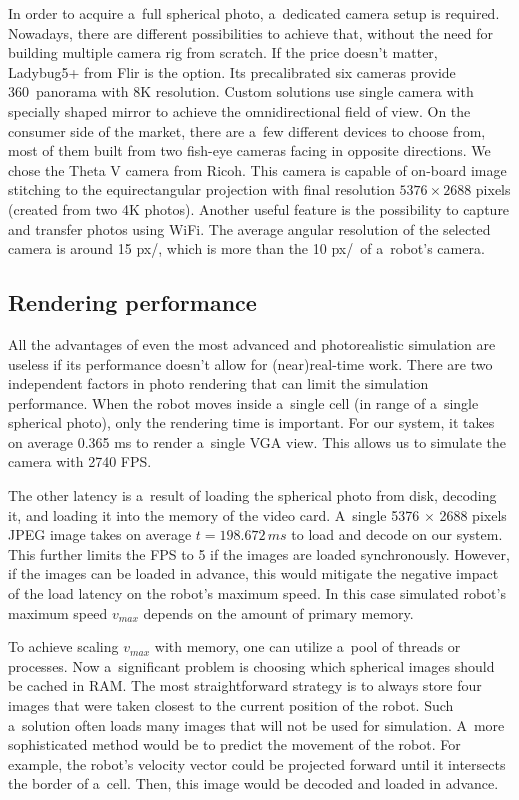 \documentclass[conference]{ieeetran}
\begin{document}
In order to acquire a~full spherical photo, a~dedicated camera setup is required. Nowadays, there are different 
possibilities to achieve that, without the need for building multiple camera rig from scratch. If the price 
doesn't matter, Ladybug5+ from Flir is the option. Its precalibrated six cameras provide 360\textdegree\ 
panorama with 8K resolution. Custom solutions use single camera with specially shaped mirror \cite{wkasik2017embedded}
to achieve the omnidirectional field of view. On the consumer side of the market, there are a~few different devices to choose from,
most of them built from two fish-eye cameras facing in opposite directions. We chose the Theta V camera from Ricoh. 
This camera is capable of on-board image stitching to the equirectangular projection with final resolution
$5376\times2688$ pixels (created from two 4K photos). Another useful feature is the possibility to capture
and transfer photos using WiFi. The average angular resolution of the selected camera is around 15 px/\textdegree, 
which is more than the 10 px/\textdegree\ of a~robot's camera. 

\subsection{Rendering performance}

All the advantages of even the most advanced and photorealistic simulation are useless if its performance 
doesn't allow for (near)real-time work. There are two independent factors in photo rendering that can limit
the simulation performance. When the robot moves inside a~single cell (in range of a~single spherical
photo), only the rendering time is important. For our system, it takes on average 0.365 ms to
render a~single VGA view. This allows us to simulate the camera with 2740 FPS. 

The other latency is a~result of loading the spherical photo from disk, decoding it, and loading it into the memory of the video card.
A~single 5376 $\times$ 2688 pixels JPEG image takes on average $t = 198.672\,ms$ to load and decode on our system.
This further limits the FPS to 5 if the images are loaded synchronously.
However, if the images can be loaded in advance, this would mitigate the negative impact of the load latency on the robot's maximum speed.
In this case simulated robot's maximum speed $v_{max}$ depends on the amount of primary memory.

To achieve scaling $v_{max}$ with memory, one can utilize a~pool of threads or processes.
Now a~significant problem is choosing which spherical images should be cached in RAM.
The most straightforward strategy is to always store four images that were taken closest to the current position of the robot.
Such a~solution often loads many images that will not be used for simulation.
A~more sophisticated method would be to predict the movement of the robot.
For example, the robot's velocity vector could be projected forward until it intersects the border of a~cell.
Then, this image would be decoded and loaded in advance.
\end{document}
